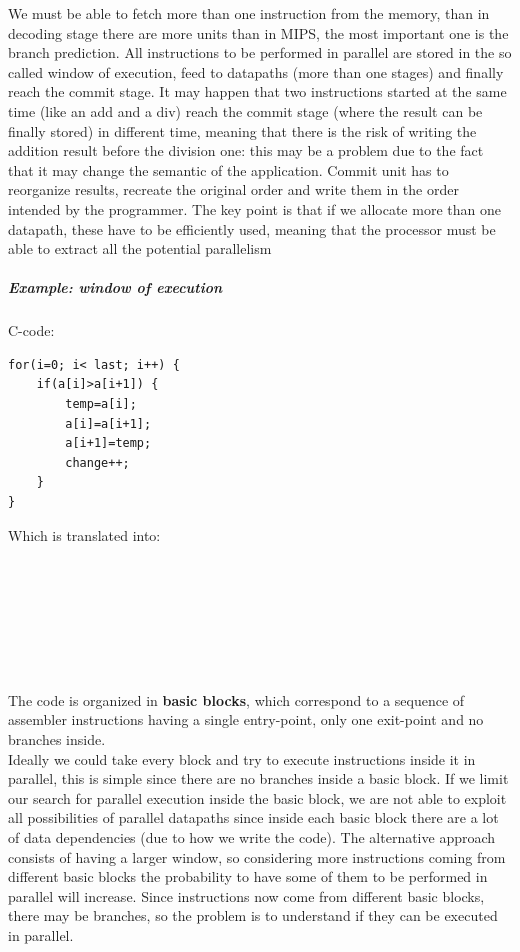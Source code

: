 We must be able to fetch more than one instruction from the memory, than in decoding stage there are more units than in MIPS, the most important one is the branch prediction. All instructions to be performed in parallel are stored in the so called window of execution, feed to datapaths (more than one stages) and finally reach the commit stage. It may happen that two instructions started at the same time (like an add and a div) reach the commit stage (where the result can be finally stored) in different time, meaning that there is the risk of writing the addition result before the division one: this may be a problem due to the fact that it may change the semantic of the application. Commit unit has to reorganize results, recreate the original order and write them in the order intended by the programmer. The key point is that if we allocate more than one datapath, these have to be efficiently used, meaning that the processor must be able to extract all the potential parallelism

\subparagraph{Example: window of execution}

C-code:

\begin{verbatim}
for(i=0; i< last; i++) {
    if(a[i]>a[i+1]) {
        temp=a[i];
        a[i]=a[i+1];
        a[i+1]=temp;
        change++;
    }
}
\end{verbatim}
Which is translated into:

\begin{verbatim}







\end{verbatim}


The code is organized in \textbf{basic blocks}, which correspond to a sequence of assembler instructions having a single entry-point, only one exit-point and no branches inside.\\


Ideally we could take every block and try to execute instructions inside it in parallel, this is simple since there are no branches inside a basic block. If we limit our search for parallel execution inside the basic block, we are not able to exploit all possibilities of parallel datapaths since inside each basic block there are a lot of data dependencies (due to how we write the code). The alternative approach consists of having a larger window, so considering more instructions coming from different basic blocks the probability to have some of them to be performed in parallel will increase. Since instructions now come from different basic blocks, there may be branches, so the problem is to understand if they can be executed in parallel.\\

